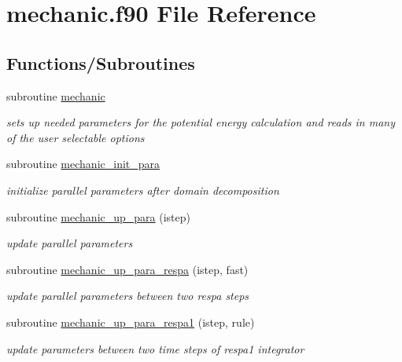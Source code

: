 \hypertarget{mechanic_8f90}{\section{mechanic.\-f90 File Reference}
\label{mechanic_8f90}
}
\subsection*{Functions/\-Subroutines}
\begin{DoxyCompactItemize}
\item 
subroutine \hyperlink{mechanic_8f90_a378feb91f7b4c73a0abb3f0972a9aa79}{mechanic}
\begin{DoxyCompactList}\small\item\em sets up needed parameters for the potential energy calculation and reads in many of the user selectable options \end{DoxyCompactList}\item 
subroutine \hyperlink{mechanic_8f90_aa9f886abb39ff1b2ac317a3211c6f079}{mechanic\-\_\-init\-\_\-para}
\begin{DoxyCompactList}\small\item\em initialize parallel parameters after domain decomposition \end{DoxyCompactList}\item 
subroutine \hyperlink{mechanic_8f90_acaf8551e812eeac7b265a258e0c86609}{mechanic\-\_\-up\-\_\-para} (istep)
\begin{DoxyCompactList}\small\item\em update parallel parameters \end{DoxyCompactList}\item 
subroutine \hyperlink{mechanic_8f90_a556247c717f6fe5510709e7a17a4a31e}{mechanic\-\_\-up\-\_\-para\-\_\-respa} (istep, fast)
\begin{DoxyCompactList}\small\item\em update parallel parameters between two respa steps \end{DoxyCompactList}\item 
subroutine \hyperlink{mechanic_8f90_a55553e62ec26b47755d4dab69f070691}{mechanic\-\_\-up\-\_\-para\-\_\-respa1} (istep, rule)
\begin{DoxyCompactList}\small\item\em update parameters between two time steps of respa1 integrator \end{DoxyCompactList}\end{DoxyCompactItemize}


